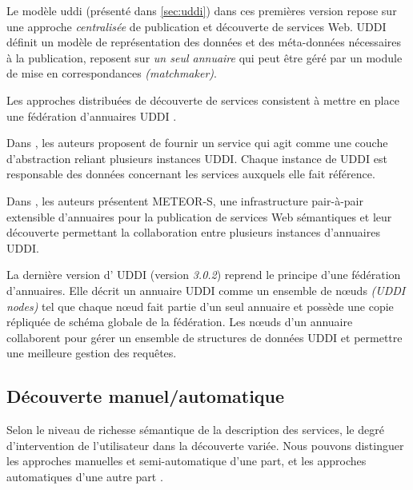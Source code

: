   Le modèle \acrshort{uddi} \cite{clement2004uddi} (présenté dans
  \ref{sec:uddi}) dans ces premières version repose sur une approche
  \textit{centralisée} de publication et découverte de services
  Web. \textsc{UDDI} définit un modèle de représentation des données
  et des méta-données nécessaires à la publication, reposent sur
  \textit{un seul annuaire} qui peut être géré par un module de mise
  en correspondances \textit{(matchmaker)}.

  Les approches distribuées de découverte de services consistent à
  mettre en place une fédération d'annuaires \textsc{UDDI}
  \cite{rompothong2003query, sivashanmugam2004discovery}.

  Dans \cite{sivashanmugam2004discovery}, les auteurs proposent de
  fournir un service qui agit comme une couche d'abstraction reliant
  plusieurs instances \textsc{UDDI}. Chaque instance de \textsc{UDDI}
  est responsable des données concernant les services auxquels elle
  fait référence.

  Dans \cite{verma2005meteor}, les auteurs présentent
  \textsc{METEOR-S}, une infrastructure pair-à-pair extensible
  d'annuaires pour la publication de services Web sémantiques et leur
  découverte permettant la collaboration entre plusieurs instances
  d'annuaires \textsc{UDDI}.

  La dernière version d' \textsc{UDDI} \cite{oasis2005specification}
  (version \textit{3.0.2}) reprend le principe d'une fédération
  d'annuaires. Elle décrit un annuaire \textsc{UDDI} comme un ensemble
  de nœuds \textit{(UDDI nodes)} tel que chaque nœud fait partie d'un
  seul annuaire et possède une copie répliquée de schéma globale de la
  fédération. Les nœuds d'un annuaire collaborent pour gérer un
  ensemble de structures de données \textsc{UDDI} et permettre une
  meilleure gestion des requêtes.

  \subsection{Découverte manuel/automatique}
  \label{sec:ws-desc:manual-vs-auto}

  Selon le niveau de richesse sémantique de la description des
  services, le degré d'intervention de l'utilisateur dans la
  découverte variée. Nous pouvons distinguer les approches manuelles
  et semi-automatique d'une part, et les approches automatiques d'une
  autre part \cite{elie2010,garofalakis2004web}.

